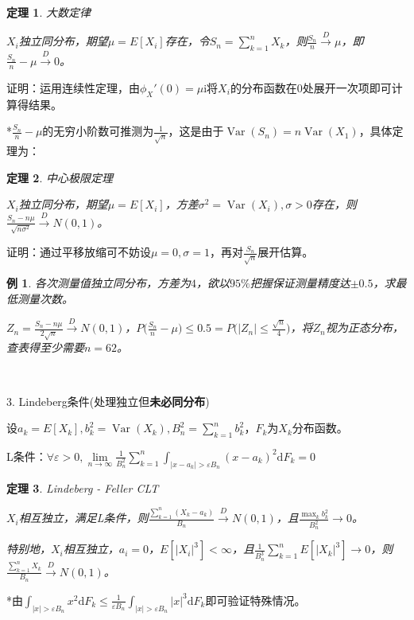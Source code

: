 \documentclass[a4paper,UTF8,fontset=windows]{ctexart}
\newtheorem{thm}{定理}[section]
\newtheorem{exmp}{例}[section]
\DeclareMathOperator{\Var}{Var}
\newcommand{\con}[1]{\stackrel{#1}{\longrightarrow}}
\begin{document}
\begin{thm} 大数定律

$X_i$独立同分布，期望$\mu=E[X_i]$存在，令$S_n=\sum_{k=1}^nX_k$，则$\frac{S_n}{n}\con{D}\mu$，即$\frac{S_n}{n}-\mu\con{D}0$。
\end{thm}

证明：运用连续性定理，由$\phi_X'(0)=\mu\mathrm{i}$将$X_i$的分布函数在0处展开一次项即可计算得结果。

*$\frac{S_n}{n}-\mu$的无穷小阶数可推测为$\frac{1}{\sqrt{n}}$，这是由于$\Var(S_n)=n\Var(X_1)$，具体定理为：

\begin{thm} 中心极限定理

$X_i$独立同分布，期望$\mu=E[X_i]$，方差$\sigma^2=\Var(X_i),\sigma>0$存在，则$\frac{S_n-n\mu}{\sqrt{n\sigma^2}}\con{D}N(0,1)$。 
\end{thm}

证明：通过平移放缩可不妨设$\mu=0,\sigma=1$，再对$\frac{S_n}{\sqrt{n}}$展开估算。

\begin{exmp} 各次测量值独立同分布，方差为$4$，欲以$95\%$把握保证测量精度达$\pm0.5$，求最低测量次数。

$Z_n=\frac{S_n-n\mu}{2\sqrt{n}}\con{D}N(0,1)$，$P\bigg(\frac{S_n}{n}-\mu\bigg)\le0.5=P\bigg(|Z_n|\le\frac{\sqrt{n}}{4}\bigg)$，将$Z_n$视为正态分布，查表得至少需要$n=62$。
\end{exmp}

~

3. Lindeberg条件(处理独立但\textbf{未必同分布})

设$a_k=E[X_k],b_k^2=\Var(X_k),B_n^2=\sum_{k=1}^nb_k^2$，$F_k$为$X_k$分布函数。

L条件：$\forall\varepsilon>0,\lim\limits_{n\to\infty}\frac{1}{B_n^2}\sum_{k=1}^n\int_{|x-a_k|>\varepsilon B_n}(x-a_k)^2\mathrm{d}F_k=0$

\begin{thm} Lindeberg - Feller CLT

$X_i$相互独立，满足L条件，则$\frac{\sum_{k=1}^n(X_k-a_k)}{B_n}\con{D}N(0,1)$，且$\frac{\max_kb_k^2}{B_n^2}\con{}0$。

特别地，$X_i$相互独立，$a_i=0$，$E[|X_i|^3]<\infty$，且$\frac{1}{B_n^3}\sum_{k=1}^nE[|X_k|^3]\con{}0$，则$\frac{\sum_{k=1}^nX_k}{B_n}\con{D}N(0,1)$。
\end{thm}

*由$\int_{|x|>\varepsilon B_n}x^2\mathrm{d}F_k\le\frac{1}{\varepsilon B_n}\int_{|x|>\varepsilon B_n}|x|^3\mathrm{d}F_k$即可验证特殊情况。
\end{document}
